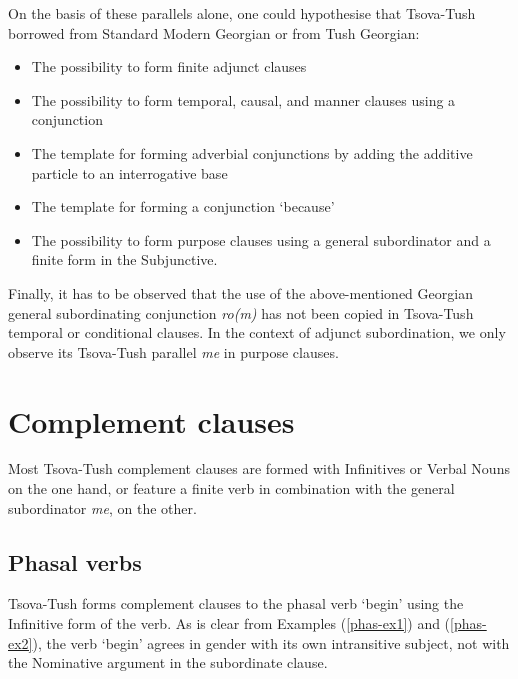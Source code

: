 On the basis of these parallels alone, one could hypothesise that Tsova-Tush borrowed from Standard Modern Georgian or from Tush Georgian:\pagebreak

\begin{itemize}
	\item The possibility to form finite adjunct clauses
	\item The possibility to form temporal, causal, and manner clauses using a conjunction 
	\item The template for forming adverbial conjunctions by adding the additive particle to an interrogative base
	\item The template for forming a conjunction ‘because’
	\item The possibility to form purpose clauses using a general subordinator and a finite form in the Subjunctive.
\end{itemize}

Finally, it has to be observed that the use of the above-mentioned Georgian general subordinating conjunction \textit{ro(m)} has not been copied in Tsova-Tush temporal or conditional clauses. In the context of adjunct subordination, we only observe its Tsova-Tush parallel \textit{me} in purpose clauses.


\section{Complement clauses}\label{complement}

Most Tsova-Tush complement clauses are formed with Infinitives or Verbal Nouns on the one hand, or feature a finite verb in combination with the general subordinator \textit{me}, on the other. 



\subsection{Phasal verbs}\label{phas}

Tsova-Tush forms complement clauses to the phasal verb ‘begin’ using the Infinitive form of the verb. As is clear from Examples (\ref{phas-ex1}) and (\ref{phas-ex2}), the verb `begin' agrees in gender with its own intransitive subject, not with the Nominative argument in the subordinate clause.


